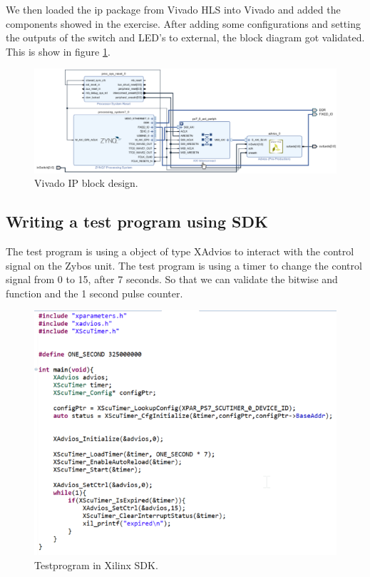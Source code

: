 \documentclass[a4paper,12pt]{report}    %
\begin{document}
We then loaded the ip package from Vivado HLS into Vivado and added the components showed in the exercise. After adding some configurations and setting the outputs of the switch and LED's to external, the block diagram got validated. This is show in figure \ref{FIG::27::VIVADO}.

\begin{figure}[H]
  \centering
  \includegraphics[width=\linewidth]{latex/figures/ass2_27_vivado_ip_design.png}
  \caption{Vivado IP block design.}
  \label{FIG::27::VIVADO}
\end{figure}

\subsection{Writing a test program using SDK}

The test program is using a object of type XAdvios to interact with the control signal on the Zybos unit. The test program is using a timer to change the control signal from 0 to 15, after 7 seconds. So that we can validate the bitwise and function and the 1 second pulse counter.
\begin{figure}[H]
  \centering
  \includegraphics[width=\linewidth]{latex/figures/ass2_27_sdk_result.png}
  \caption{Testprogram in Xilinx SDK.}
  \label{FIG::27::XILINX}
\end{figure}
\end{document}
